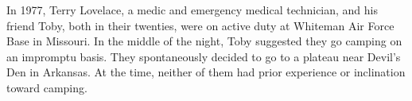 %
%
%
%


In 1977, Terry Lovelace, a medic and emergency medical technician, and his friend Toby, both in their twenties, were on active duty at Whiteman Air Force Base in Missouri. In the middle of the night, Toby suggested they go camping on an impromptu basis. They spontaneously decided to go to a plateau near Devil's Den in Arkansas.
At the time, neither of them had prior experience or inclination toward camping.

